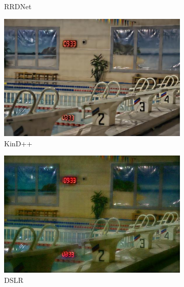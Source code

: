 \documentclass[a4paper, 10pt]{article}
\begin{document}
\begin{figure}[htb]
\begin{subfigure}{0.19\textwidth}
				\captionsetup{font=scriptsize}
				\caption{RRDNet}
				\label{fig: RRDNet}
			\end{subfigure}
			\begin{subfigure}{0.19\textwidth}
				\includegraphics[width=\linewidth]{picture/LLIE/Experiment/KinD++}
				\captionsetup{font=scriptsize}
				\caption{KinD++}
				\label{fig: KinD++}	
			\end{subfigure}
			\begin{subfigure}{0.19\textwidth}
				\includegraphics[width=\linewidth]{picture/LLIE/Experiment/DSLR}
				\captionsetup{font=scriptsize}
				\caption{DSLR}
				\label{fig: DSLR}	
			\end{subfigure}\\
			\begin{subfigure}{0.19\textwidth}

\end{subfigure}
\end{figure}
\end{document}
